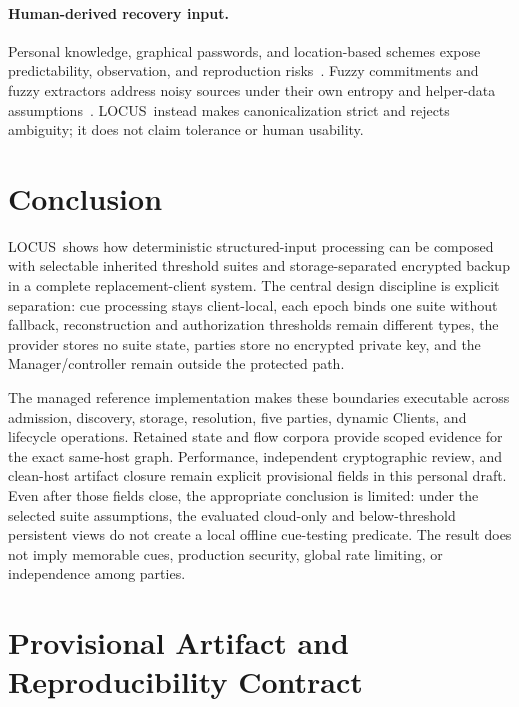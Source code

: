 \documentclass[sigconf,anonymous]{acmart}
\newcommand{\LOCUS}{\textsf{LOCUS}}
\begin{document}
\paragraph{Human-derived recovery input.}
Personal knowledge, graphical passwords, and location-based schemes expose
predictability, observation, and reproduction risks~\cite{Bonneau2015Secrets,Yan2004Password,Biddle2012Graphical,AlAmeen2015Cues,Hang2015LocationFallback}.
Fuzzy commitments and fuzzy extractors address noisy sources under their own
entropy and helper-data assumptions~\cite{FuzzyCommitment1999,FuzzyExtractors2004}.
\LOCUS\ instead makes canonicalization strict and rejects ambiguity; it does
not claim tolerance or human usability.

\section{Conclusion}
\label{sec:conclusion}

\LOCUS\ shows how deterministic structured-input processing can be composed
with selectable inherited threshold suites and storage-separated encrypted
backup in a complete replacement-client system. The central design discipline
is explicit separation: cue processing stays client-local, each epoch binds
one suite without fallback, reconstruction and authorization thresholds remain
different types, the provider stores no suite state, parties store no
encrypted private key, and the Manager/controller remain outside the protected
path.

The managed reference implementation makes these boundaries executable across
admission, discovery, storage, resolution, five parties, dynamic Clients, and
lifecycle operations. Retained state and flow corpora provide scoped evidence
for the exact same-host graph. Performance, independent cryptographic review,
and clean-host artifact closure remain explicit provisional fields in this
personal draft. Even after those fields close, the appropriate conclusion is
limited: under the selected suite assumptions, the evaluated cloud-only and
below-threshold persistent views do not create a local offline cue-testing
predicate. The result does not imply memorable cues, production security,
global rate limiting, or independence among parties.




\appendix

\section{Provisional Artifact and Reproducibility Contract}
\end{document}
